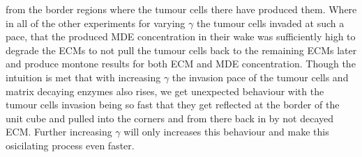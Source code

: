 from the border regions where the tumour cells there have produced them.
Where in all of the other experiments for varying $\gamma$ the tumour cells invaded at such a pace, that the produced MDE concentration in their wake was sufficiently high to degrade the ECMs to not pull the tumour cells back to the remaining ECMs later and produce montone results for both ECM and MDE concentration.
Though the intuition is met that with increasing $\gamma$ the invasion pace of the tumour cells and matrix decaying enzymes also rises, we get unexpected behaviour with the tumour cells invasion being so fast that they get reflected at the border of the unit cube and pulled into the corners and from there back in by not decayed ECM. Further increasing $\gamma$ will only increases this behaviour and make this osicilating process even faster.


